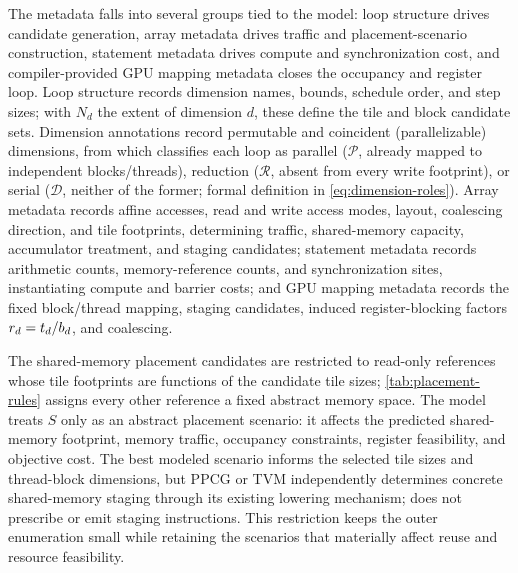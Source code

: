The metadata falls into several groups tied to the model: loop structure drives candidate generation, array metadata drives traffic and placement-scenario construction, statement metadata drives compute and synchronization cost, and compiler-provided GPU mapping metadata closes the occupancy and register loop. Loop structure records dimension names, bounds, schedule order, and step sizes; with \(N_d\) the extent of dimension \(d\), these define the tile and block candidate sets. Dimension annotations record permutable and coincident (parallelizable) dimensions, from which \name classifies each loop as parallel (\(\mathcal{P}\), already mapped to independent blocks/threads), reduction (\(\mathcal{R}\), absent from every write footprint), or serial (\(\mathcal{D}\), neither of the former; formal definition in \autoref{eq:dimension-roles}). Array metadata records affine accesses, read and write access modes, layout, coalescing direction, and tile footprints, determining traffic, shared-memory capacity, accumulator treatment, and staging candidates; statement metadata records arithmetic counts, memory-reference counts, and synchronization sites, instantiating compute and barrier costs; and GPU mapping metadata records the fixed block/thread mapping, staging candidates, induced register-blocking factors \(r_d=t_d/b_d\), and coalescing.

The shared-memory placement candidates are restricted to read-only references whose tile footprints are functions of the candidate tile sizes; \autoref{tab:placement-rules} assigns every other reference a fixed abstract memory space. The model treats \(S\) only as an abstract placement scenario: it affects the predicted shared-memory footprint, memory traffic, occupancy constraints, register feasibility, and objective cost. The best modeled scenario informs the selected tile sizes and thread-block dimensions, but PPCG or TVM independently determines concrete shared-memory staging through its existing lowering mechanism; \name does not prescribe or emit staging instructions. This restriction keeps the outer enumeration small while retaining the scenarios that materially affect reuse and resource feasibility.

